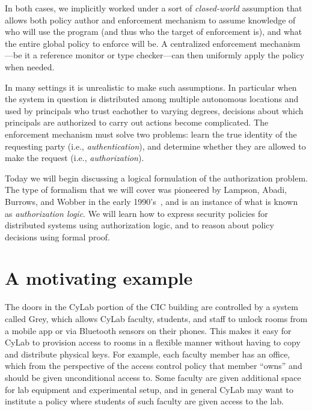 \documentclass[11pt,twoside]{scrartcl}
\begin{document}
In both cases, we implicitly worked under a sort of \emph{closed-world} assumption that allows both policy author and enforcement mechanism to assume knowledge of who will use the program (and thus who the target of enforcement is), and what the entire global policy to enforce will be. A centralized enforcement mechanism---be it a reference monitor or type checker---can then uniformly apply the policy when needed.

In many settings it is unrealistic to make such assumptions. In particular when the system in question is distributed among multiple autonomous locations and used by principals who trust eachother to varying degrees, decisions about which principals are authorized to carry out actions become complicated. The enforcement mechanism must solve two problems: learn the true identity of the requesting party (i.e., \emph{authentication}), and determine whether they are allowed to make the request (i.e., \emph{authorization}).

Today we will begin discussing a logical formulation of the authorization problem. The type of formalism that we will cover was pioneered by Lampson, Abadi, Burrows, and Wobber in the early 1990's~\cite{Lampson1992}, and is an instance of what is known as \emph{authorization logic}. We will learn how to express security policies for distributed systems using authorization logic, and to reason about policy decisions using formal proof.

\section{A motivating example}

The doors in the CyLab portion of the CIC building are controlled by a system called Grey, which allows CyLab faculty, students, and staff to unlock rooms from a mobile app or via Bluetooth sensors on their phones. This makes it easy for CyLab to provision access to rooms in a flexible manner without having to copy and distribute physical keys. For example, each faculty member has an office, which from the perspective of the access control policy that member ``owns'' and should be given unconditional access to. Some faculty are given additional space for lab equipment and experimental setup, and in general CyLab may want to institute a policy where students of such faculty are given access to the lab.
\end{document}
